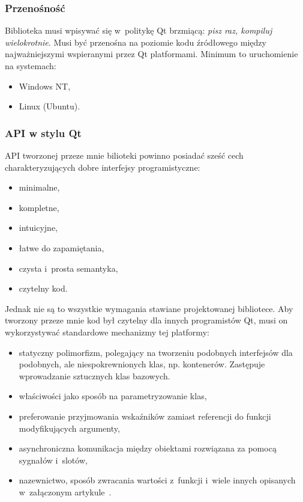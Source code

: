 \documentclass[11pt,twoside,a4paper,final]{article}
\begin{document}
\subsubsection{Przenośność}
Biblioteka musi wpisywać się w~politykę Qt brzmiącą: \textit{pisz raz, kompiluj wielokrotnie}. Musi być przenośna na poziomie kodu źródłowego między najważniejszymi wspieranymi przez Qt platformami.
Minimum to uruchomienie na systemach:
\begin{itemize}
\item{Windows NT,}
\item{Linux (Ubuntu).}
\end{itemize}


\subsubsection{API w stylu Qt}
API tworzonej przeze mnie bilioteki powinno posiadać sześć cech charakteryzujących dobre interfejsy programistyczne:
\begin{itemize}
\item{minimalne,}
\item{kompletne,}
\item{intuicyjne,} 
\item{łatwe do zapamiętania,}
\item{czysta i~prosta semantyka,}
\item{czytelny kod.}
\end{itemize}

Jednak nie są to wszystkie wymagania stawiane projektowanej bibliotece. Aby tworzony przeze mnie kod był czytelny dla innych programistów Qt, musi on wykorzystywać standardowe mechanizmy tej platformy:
\begin{itemize}
\item{statyczny polimorfizm, polegający na tworzeniu podobnych interfejsów dla podobnych, ale niespokrewnionych klas, np. kontenerów. Zastępuje wprowadzanie sztucznych klas bazowych.}
\item{właściwości jako sposób na parametryzowanie klas,}
\item{preferowanie przyjmowania wskaźników zamiast referencji do funkcji modyfikujących argumenty,}
\item{asynchroniczna komunikacja między obiektami rozwiązana za pomocą sygnałów i~slotów,}
\item{nazewnictwo, sposób zwracania wartości z~funkcji i~wiele innych opisanych w~załączonym artykule~\cite{qt-api}.}
\end{itemize}
\end{document}
